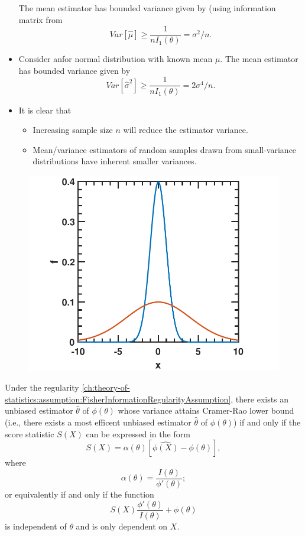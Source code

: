 \begin{refsection}
\begin{example}
\begin{itemize}
		
		
		The mean estimator has bounded variance given by (using information matrix from 
		$$Var[\hat{\mu}] \geq \frac{1}{nI_1(\theta)} = \sigma^2/n.$$
		
		
		\item Consider anfor normal distribution with known mean $\mu$. The mean estimator has bounded variance given by
		$$Var[\hat{\sigma}^2] \geq \frac{1}{nI_1(\theta)} = 2\sigma^4/n.$$
		
		\item 	It is clear that
		\begin{itemize}
			\item Increasing sample size $n$ will reduce the estimator variance.
			\item Mean/variance estimators of random samples drawn from small-variance distributions have inherent smaller variances.
		\end{itemize}
	\end{itemize}	
\end{example}


\begin{figure}[H]
	\centering
	\includegraphics[width=0.5\linewidth]{../figures/statisticalModeling/estimationTheory/fisherInformationDemo}
	\caption{}
	\label{ch:theory-of-statistics:fig:fisherinformationdemo}
\end{figure}




\begin{theorem}
Under the regularity \autoref{ch:theory-of-statistics:assumption:FisherInformationRegularityAssumption}, there exists an unbiased estimator $\hat{\theta}$ of $\phi(\theta)$ whose variance attains Cramer-Rao lower bound (i.e., there exists a most efficent unbiased estimator $\hat{\theta}$ of $\phi(\theta)$) if and only if the score statistic $S(X)$ can be expressed in the form
$$S(X) = \alpha(\theta)[\hat{\phi(X)} - \phi(\theta)],$$
where $$\alpha(\theta) = \frac{I(\theta)}{\phi'(\theta)};$$
or equivalently if and only if the function 
$$S(X)\frac{\phi'(\theta)}{I(\theta)} + \phi(\theta)$$
is independent of $\theta$ and is only dependent on $X$.	
\end{theorem}




\end{refsection}
